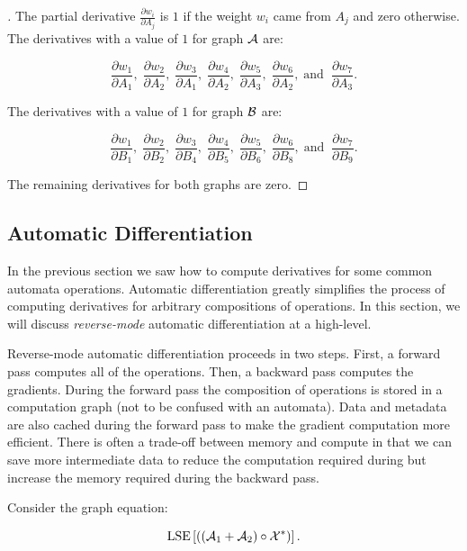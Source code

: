 \begin{proof}[\unskip\nopunct]
The partial derivative $\frac{\partial w_i}{\partial A_j}$ is $1$ if the weight
$w_i$ came from $A_j$ and zero otherwise. The derivatives with a value of $1$
for graph $\mathcal{A}$ are:

$$
\frac{\partial w_1}{\partial A_1}, \; \frac{\partial w_2}{\partial A_2}, \;
    \frac{\partial w_3}{\partial A_1}, \; \frac{\partial w_4}{\partial A_2}, \;
    \frac{\partial w_5}{\partial A_3}, \; \frac{\partial w_6}{\partial A_2}, \;
    \textrm{and} \;\; \frac{\partial w_7}{\partial A_3}.
$$

The derivatives with a value of $1$ for graph $\mathcal{B}$ are:

$$
\frac{\partial w_1}{\partial B_1}, \; \frac{\partial w_2}{\partial B_2}, \;
    \frac{\partial w_3}{\partial B_4}, \; \frac{\partial w_4}{\partial B_5}, \;
    \frac{\partial w_5}{\partial B_6}, \; \frac{\partial w_6}{\partial B_8}, \;
    \textrm{and} \;\; \frac{\partial w_7}{\partial B_9}.
$$

The remaining derivatives for both graphs are zero.
\end{proof}

\subsection{Automatic Differentiation}

In the previous section we saw how to compute derivatives for some common
automata operations. Automatic differentiation greatly simplifies the process
of computing derivatives for arbitrary compositions of operations. In this
section, we will discuss \emph{reverse-mode} automatic differentiation at a
high-level.

Reverse-mode automatic differentiation proceeds in two steps. First, a forward
pass computes all of the operations. Then, a backward pass computes the
gradients. During the forward pass the composition of operations is stored in a
computation graph (not to be confused with an automata). Data and metadata are
also cached during the forward pass to make the gradient computation more
efficient. There is often a trade-off between memory and compute in that we can
save more intermediate data to reduce the computation required during but
increase the memory required during the backward pass.

Consider the graph equation:

\begin{equation}
    \label{eq:compute_graph}
    \operatorname*{\textrm{LSE}}\left[ \left(\left(\mathcal{A}_1 + \mathcal{A}_2\right) \circ \mathcal{X}^*\right) \right].
\end{equation}


